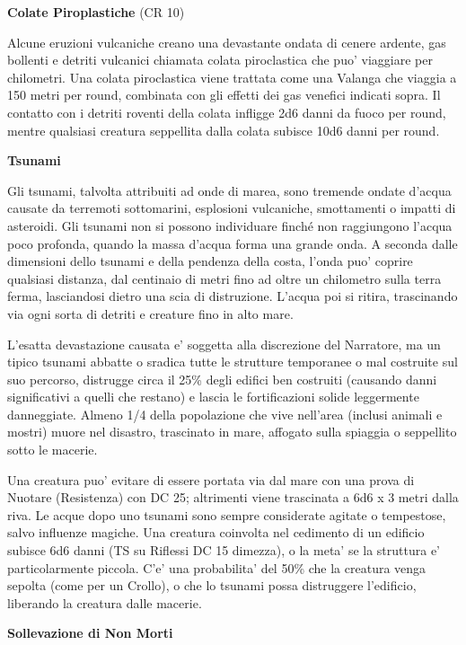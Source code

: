 \documentclass[a4paper,11pt,twoside,openany]{book}
\begin{document}
\textbf{Colate Piroplastiche} (CR 10)

Alcune eruzioni vulcaniche creano una devastante ondata di cenere ardente, gas bollenti e detriti vulcanici chiamata colata piroclastica che puo' viaggiare per chilometri. Una colata piroclastica viene trattata come una Valanga che viaggia a 150 metri per round, combinata con gli effetti dei gas venefici indicati sopra. Il contatto con i detriti roventi della colata infligge 2d6 danni da fuoco per round, mentre qualsiasi creatura seppellita dalla colata subisce 10d6 danni per round.

\textbf{Tsunami}

Gli tsunami, talvolta attribuiti ad onde di marea, sono tremende ondate d'acqua causate da terremoti sottomarini, esplosioni vulcaniche, smottamenti o impatti di asteroidi. Gli tsunami non si possono individuare finché non raggiungono l'acqua poco profonda, quando la massa d'acqua forma una grande onda. A seconda dalle dimensioni dello tsunami e del­la pendenza della costa, l'onda puo' coprire qualsiasi distanza, dal centinaio di metri fino ad oltre un chilometro sulla terra ferma, lasciandosi dietro una scia di distruzione. L'acqua poi si ritira, trascinando via ogni sorta di detriti e creature fino in alto mare.

L'esatta devastazione causata e' soggetta alla discrezione del Narratore, ma un tipico tsunami abbatte o sradica tutte le strutture temporanee o mal costruite sul suo percorso, distrugge circa il 25\% degli edifici ben costruiti (causando danni significativi a quelli che restano) e lascia le fortificazioni solide leggermente danneggiate. Almeno 1/4 della popolazione che vive nell'area (inclusi animali e mostri) muore nel disastro, trascinato in mare, affogato sulla spiaggia o seppellito sotto le macerie.

Una creatura puo' evitare di essere portata via dal mare con una prova di Nuotare (Resistenza) con DC 25; altrimenti viene trascinata a 6d6 x 3 metri dalla riva. Le acque dopo uno tsunami sono sempre considerate agitate o tempestose, salvo influenze magiche. Una creatura coinvolta nel cedimento di un edificio subisce 6d6 danni (TS su Riflessi DC 15 dimezza), o la meta' se la struttura e' particolarmente piccola. C'e' una probabilita' del 50\% che la creatura venga sepolta (come per un Crollo), o che lo tsunami possa distruggere l'edificio, liberando la creatura dalle macerie.

\textbf{Sollevazione di Non Morti}
\end{document}
